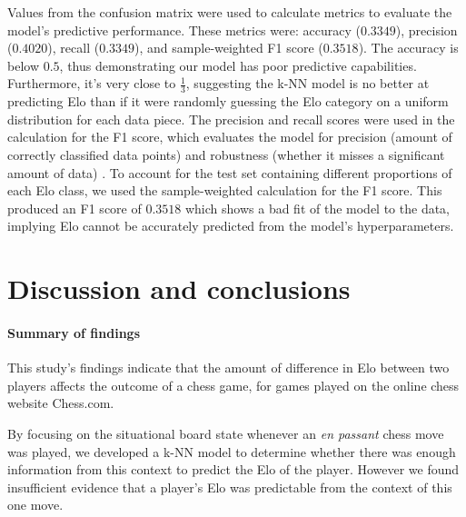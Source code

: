 \documentclass[10pt,a4paper]{article}
\begin{document}
\begin{multicols}{2}
Values from the confusion matrix were used to calculate metrics to evaluate the model's predictive performance. These metrics were: accuracy ($0.3349$), precision ($0.4020$), recall ($0.3349$), and sample-weighted F1 score ($0.3518$). The accuracy is below $0.5$, thus demonstrating our model has poor predictive capabilities. Furthermore, it's very close to $\frac{1}{3}$, suggesting the k-NN model is no better at predicting Elo than if it were randomly guessing the Elo category on a uniform distribution for each data piece. The precision and recall scores were used in the calculation for the F1 score, which evaluates the model for precision (amount of correctly classified data points) and robustness (whether it misses a significant amount of data) \cite{MetricsToEvaluateYourML}. To account for the test set containing different proportions of each Elo class, we used the sample-weighted calculation for the F1 score. This produced an F1 score of $0.3518$ which shows a bad fit of the model to the data, implying Elo cannot be accurately predicted from the model's hyperparameters. \newline




\section{Discussion and conclusions}

\paragraph{Summary of findings}
This study's findings indicate that the amount of difference in Elo between two players affects the outcome of a chess game, for games played on the online chess website Chess.com.  \newline

By focusing on the situational board state whenever an \textit{en passant} chess move was played, we developed a k-NN model to determine whether there was enough information from this context to predict the Elo of the player. However we
found insufficient evidence that a player's Elo was predictable from the context of this one move.



\end{multicols}
\end{document}
